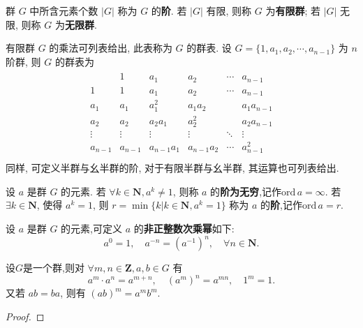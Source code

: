 \documentclass[../../main.tex]{subfiles}
\begin{document}
\begin{definition}
群 \( G \) 中所含元素个数 \( |G| \) 称为 \( G \) 的\textbf{阶}. 若 \( |G| \) 有限, 则称 \( G \) 为\textbf{有限群}; 若 \( |G| \) 无限, 则称 \( G \) 为\textbf{无限群}.
\end{definition}
\begin{remark}
有限群 \( G \) 的乘法可列表给出, 此表称为 \( G \) 的群表. 设 \( G = \{1, a_1, a_2, \cdots, a_{n-1}\} \) 为 \( n \) 阶群, 则 \( G \) 的群表为
\begin{align*}
\begin{array}{c|ccccc}
& 1 & a_1 & a_2 & \cdots & a_{n-1} \\
\hline
1 & 1 & a_1 & a_2 & \cdots & a_{n-1} \\
a_1 & a_1 & a_1^2 & a_1a_2 &  & a_1a_{n-1} \\
a_2 & a_2 & a_2a_1 & a_2^2 &  & a_2a_{n-1} \\
\vdots & \vdots & \vdots & \vdots & \ddots & \vdots \\
a_{n-1} & a_{n-1} & a_{n-1}a_1 & a_{n-1}a_2 & \cdots & a_{n-1}^2 \\
\end{array}
\end{align*}
同样, 可定义半群与幺半群的阶, 对于有限半群与幺半群, 其运算也可列表给出.
\end{remark}

\begin{definition}
设 \( a \) 是群 \( G \) 的元素. 若 \( \forall k \in \mathbf{N}, a^k \neq 1 \), 则称 \( a \) 的\textbf{阶为无穷},记作$\mathrm{ord}\,a=\infty $. 若 \( \exists k \in \mathbf{N} \), 使得 \( a^k = 1 \), 则 \( r=\min\{k|k \in \mathbf{N}, a^k = 1\} \) 称为 \( a \) 的\textbf{阶},记作$\mathrm{ord}\,a=r$.
\end{definition}

\begin{definition}
设 \( a \) 是群 \( G \) 的元素,可定义 \( a \) 的\textbf{非正整数次乘幂}如下:
\[
a^0 = 1, \quad a^{-n} = (a^{-1})^n, \quad \forall n \in \mathbf{N}.
\]
\end{definition}

\begin{theorem}
设$G$是一个群,则对 \( \forall m, n \in \mathbf{Z}, a, b \in G \) 有
\[
a^m \cdot a^n = a^{m+n}, \quad (a^m)^n = a^{mn}, \quad 1^m = 1.
\]
又若 \( ab = ba \), 则有 \( (ab)^m = a^m b^m \).
\end{theorem}
\begin{proof}

\end{proof}
\end{document}
